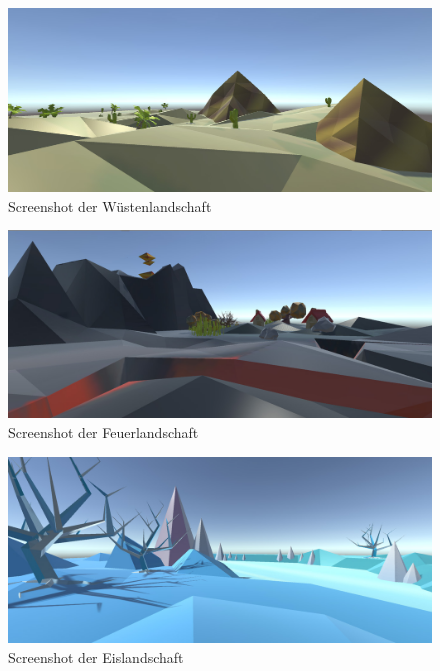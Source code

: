 
\begin{figure}[ht]%
	\centering
		\includegraphics[width=1.0\textwidth]{images/Wueste}
	\caption{Screenshot der Wüstenlandschaft}
	\label{fig:Wueste}
\end{figure}


\begin{figure}[ht]%
	\centering
		\includegraphics[width=1.0\textwidth]{images/Feuer}
	\caption{Screenshot der Feuerlandschaft}
	\label{fig:Feuer}
\end{figure}


\begin{figure}[ht]%
	\centering
		\includegraphics[width=1.0\textwidth]{images/Eis}
	\caption{Screenshot der Eislandschaft}
	\label{fig:Eis}
\end{figure}

